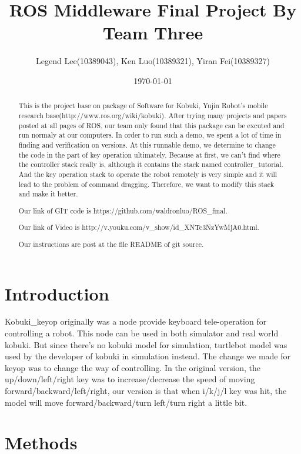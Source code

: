 \documentclass[preprint,pre,floats,aps,amsmath,amssymb]{revtex4}
\begin{document}
\title{ROS Middleware Final Project By Team Three}
\author{Legend Lee(10389043), Ken Luo(10389321), Yiran Fei(10389327)}
\date{\today}

\begin{abstract}
This is the project base on package of Software for Kobuki, Yujin Robot's mobile research base(http://www.ros.org/wiki/kobuki). After trying many projects and papers posted at all pages of ROS, our team only found that this package can be excuted and run normaly at our computers. In order to run such a demo, we spent a lot of time in finding and verification on versions. At this runnable demo, we determine to change the code in the part of key operation ultimately. Because at first, we can't find where the controller stack really is, although it contains the stack named controller\_tutorial. And the key operation stack to operate the robot remotely is very simple and it will lead to the problem of command dragging. Therefore, we want to modify this stack and make it better.

Our link of GIT code is https://github.com/waldronluo/ROS\_final.

Our link of Video is http://v.youku.com/v\_show/id\_XNTc3NzYwMjA0.html.

Our instructions are post at the file README of git source.
\end{abstract}

\maketitle

\section{Introduction}
\label{sec:intro}

Kobuki\_keyop originally was a node provide keyboard tele-operation for controlling a robot. This node can be used in both simulator and real world kobuki. But since there's no kobuki model for simulation, turtlebot model was used by the developer of kobuki in simulation instead. The change we made for keyop was to change the way of controlling. In the original version, the up/down/left/right key was to increase/decrease the speed of moving forward/backward/left/right, our version is that when i/k/j/l key was hit, the model will move forward/backward/turn left/turn right a little bit.

\section{Methods}
\label{sec:methods}
\end{document}
